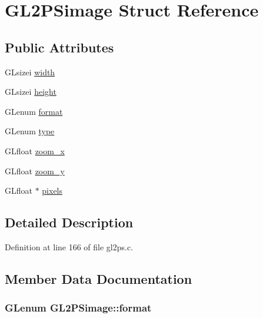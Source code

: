 \hypertarget{struct_g_l2_p_simage}{}\section{G\+L2\+P\+Simage Struct Reference}
\label{struct_g_l2_p_simage}
\subsection*{Public Attributes}
\begin{DoxyCompactItemize}
\item 
G\+Lsizei \hyperlink{struct_g_l2_p_simage_a770a027fc0f42680dc62d56b38fb1d99}{width}
\item 
G\+Lsizei \hyperlink{struct_g_l2_p_simage_affb112b35e5551913e96eaf65a683ded}{height}
\item 
G\+Lenum \hyperlink{struct_g_l2_p_simage_a7a58e7a201db4426944b4145e23b3102}{format}
\item 
G\+Lenum \hyperlink{struct_g_l2_p_simage_a3fc70a07fd043f7d0134f32b2894114f}{type}
\item 
G\+Lfloat \hyperlink{struct_g_l2_p_simage_abcbc582a823b354c09262fa5d858eba0}{zoom\+\_\+x}
\item 
G\+Lfloat \hyperlink{struct_g_l2_p_simage_a14f4807f330990ab0c203fe08669d647}{zoom\+\_\+y}
\item 
G\+Lfloat $\ast$ \hyperlink{struct_g_l2_p_simage_a01dab5410ae39f9457752b979f0a6029}{pixels}
\end{DoxyCompactItemize}


\subsection{Detailed Description}


Definition at line 166 of file gl2ps.\+c.



\subsection{Member Data Documentation}
\hypertarget{struct_g_l2_p_simage_a7a58e7a201db4426944b4145e23b3102}{}
\subsubsection[{format}]{\setlength{\rightskip}{0pt plus 5cm}G\+Lenum G\+L2\+P\+Simage\+::format}\label{struct_g_l2_p_simage_a7a58e7a201db4426944b4145e23b3102}


